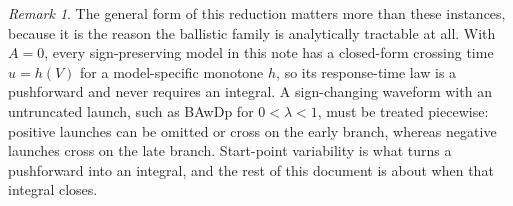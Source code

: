 \documentclass[12pt]{article}
\theoremstyle{remark}
\newtheorem{remark}{Remark}
\begin{document}
\begin{remark}
The general form of this reduction matters more than these instances, because it is the reason the ballistic family is analytically tractable at all. With $A=0$, every sign-preserving model in this note has a closed-form crossing time $u=h(V)$ for a model-specific monotone $h$, so its response-time law is a pushforward and never requires an integral. A sign-changing waveform with an untruncated launch, such as BAwDp for $0<\lambda<1$, must be treated piecewise: positive launches can be omitted or cross on the early branch, whereas negative launches cross on the late branch. Start-point variability is what turns a pushforward into an integral, and the rest of this document is about when that integral closes.
\end{remark}
\end{document}
